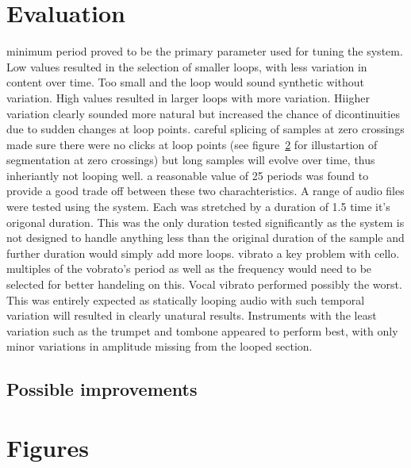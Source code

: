 \documentclass[titlepage]{scrartcl}
\begin{document}
\section{Evaluation}
minimum period proved to be the primary parameter used for tuning the system.
Low values resulted in the selection of smaller loops, with less variation in
content over time. Too small and the loop would sound synthetic without
variation. High values resulted in larger loops with more variation. Hiigher
variation clearly sounded more natural but increased the chance of
dicontinuities due to sudden changes at loop points. careful splicing of
samples at zero crossings made sure there were no clicks at loop points (see
figure~\ref{} for illustartion of segmentation at zero crossings) but
long samples will evolve over time, thus inheriantly not looping well.
a reasonable value of 25 periods was found to provide a good trade off between
these two charachteristics.
A range of audio files were tested using the system. Each was stretched by a
duration of 1.5 time it's origonal duration. This was the only duration tested
significantly as the system is not designed to handle anything less than the
original duration of the sample and further duration would simply add more
loops.
vibrato a key problem with cello. multiples of the vobrato's period as well as
the frequency would need to be selected for better handeling on this. 
Vocal vibrato performed possibly the worst. This was entirely expected as
statically looping audio with such temporal variation will resulted in clearly
unatural results.
Instruments with the least variation such as the trumpet and tombone appeared
to perform best, with only minor variations in amplitude missing from the
looped section.

\subsection{Possible improvements}
\section{Figures}
\end{document}
